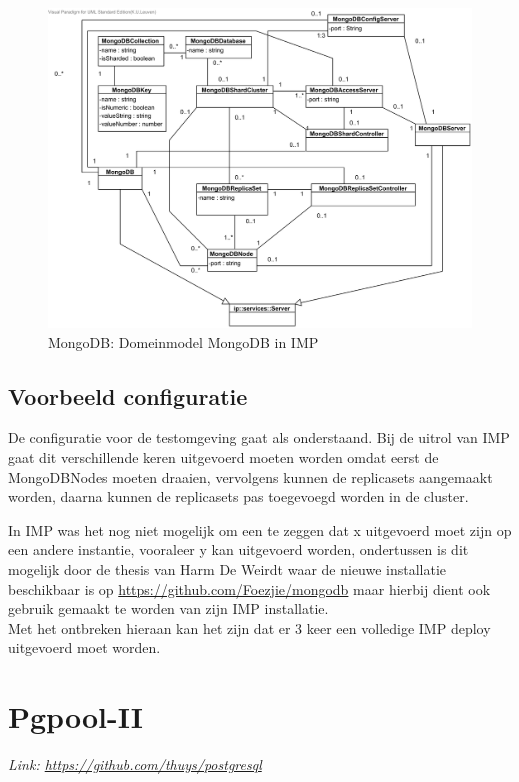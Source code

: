 \begin{figure}[ht!]
\centering
\includegraphics[width=\linewidth]{img/MongoDB-Domeinmodel.png}
\caption{MongoDB: Domeinmodel MongoDB in IMP}
\label{fig:imp-mongodb-domeinmodel}
\end{figure}

\subsection{Voorbeeld configuratie}
De configuratie voor de testomgeving gaat als onderstaand. Bij de uitrol van IMP gaat dit verschillende keren uitgevoerd moeten worden omdat eerst de MongoDBNodes moeten draaien, vervolgens kunnen de replicasets aangemaakt worden, daarna kunnen de replicasets pas toegevoegd worden in de cluster. 

In IMP was het nog niet mogelijk om een te zeggen dat x uitgevoerd moet zijn op een andere instantie, vooraleer y kan uitgevoerd worden, ondertussen is dit mogelijk door de thesis van Harm De Weirdt\cite{thesisHarm} waar de nieuwe installatie beschikbaar is op \url{https://github.com/Foezjie/mongodb} maar hierbij dient ook gebruik gemaakt te worden van zijn IMP installatie.  \\
Met het ontbreken hieraan kan het zijn dat er 3 keer een volledige IMP deploy uitgevoerd moet worden. 




\section{Pgpool-II}
\textit{Link: \url{https://github.com/thuys/postgresql}}

